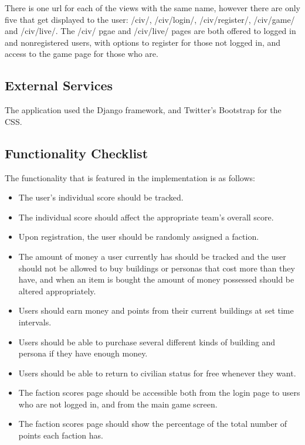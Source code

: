 \documentclass{sig-alt-release2}
\begin{document}
There is one url for each of the views with the same name, however there are only five that get displayed to the user: /civ/, /civ/login/, /civ/register/, /civ/game/ and /civ/live/. The /civ/ pgae and /civ/live/ pages are both offered to logged in and nonregistered users, with options to register for those not logged in, and access to the game page for those who are.

\subsection{External Services}

The application used the Django framework, and Twitter's Bootstrap for the CSS. 

\subsection{Functionality Checklist}

The functionality that is featured in the implementation is as follows:

\begin{itemize}

\item The user's individual score should be tracked.

\item The individual score should affect the appropriate team's overall score.

\item Upon registration, the user should be randomly assigned a faction.

\item The amount of money a user currently has should be tracked and the user should not be allowed to buy buildings or personas that cost more than they have, and when an item is bought the amount of money possessed should be altered appropriately.

\item Users should earn money and points from their current buildings at set time intervals.

\item Users should be able to purchase several different kinds of building and persona if they have enough money.

\item Users should be able to return to civilian status for free whenever they want.

\item The faction scores page should be accessible both from the login page to users who are not logged in, and from the main game screen.

\item The faction scores page should show the percentage of the total number of points each faction has.

\end{itemize}
\end{document}
